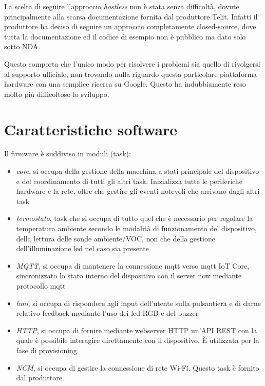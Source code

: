 \documentclass[12pt,a4paper,twoside,titlepage]{book}
\begin{document}
La scelta di seguire l'approccio \textit{hostless} non è stata senza difficoltà, dovute
principalmente alla scarsa documentazione fornita dal produttore Telit. Infatti il
produttore ha deciso di seguire un approccio completamente closed-source, dove tutta
la documentazione ed il codice di esempio non è pubblico ma dato solo sotto NDA.

Questo comporta che l'unico modo per risolvere i problemi sia quello di rivolgersi
al supporto ufficiale, non trovando nulla riguardo questa particolare piattaforma
hardware con una semplice ricerca su Google. Questo ha indubbiamente reso molto più
difficoltoso lo sviluppo.

\section{Caratteristiche software}

Il \gls{firmware} è suddiviso in moduli (task):

\begin{itemize}
    \item \textit{core}, si occupa della gestione della macchina a stati principale
        del dispositivo e del coordinamento di tutti gli altri task. Inizializza tutte
        le periferiche hardware e la rete, oltre che gestire
        gli eventi notevoli che arrivano dagli altri task
    \item \textit{termostato}, task che si occupa di tutto quel che è necessario
        per regolare la temperatura ambiente secondo le modalità di funzionamento del dispositivo,
        della lettura delle sonde ambiente/VOC, non che della gestione dell'illuminazione \acrshort{led}
        nel caso sia presente
    \item \textit{MQTT}, si occupa di mantenere la connessione \Gls{mqtt} verso \Gls{mqtt} IoT Core,
        sincronizzato lo stato interno del dispositivo con il server \Gls{now} mediante protocollo \Gls{mqtt}
    \item \textit{hmi}, si occupa di rispondere agli input dell'utente
        sulla pulsantiera e di darne relativo feedback mediante l'uso dei \acrshort{led} RGB e del buzzer
    \item \textit{HTTP}, si occupa di fornire mediante webserver HTTP un'API REST con
        la quale è possibile interagire direttamente con il dispositivo. È utilizzata
        per la fase di provisioning.
    \item \textit{NCM}, si occupa di gestire la connessione di rete Wi-Fi. Questo task
        è fornito dal produttore.
\end{itemize}
\end{document}
